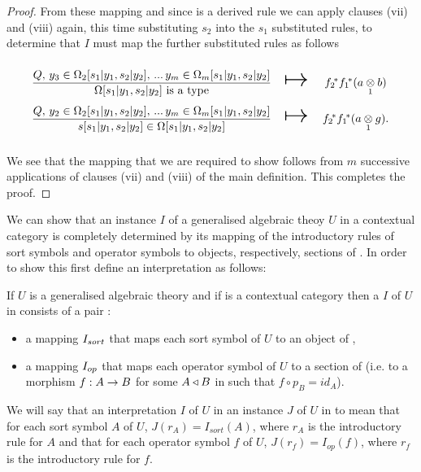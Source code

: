 {\begin{proof}
From these mapping and since  \stworule is a derived rule we can  apply clauses (vii) and (viii) again,
this time substituting $s_2$ into the $s_1$ substituted rules, to determine that $I$ must map the further substituted rules as follows
\begin{equation*}
\begin{array}{c c c}
\forceSOURCEwidth & & \forceTARGETwidth \\ [-0.1cm]
\weakenedOmegaruleSecondsubstitution  & \Imapsto & \ftwostar \fonestar(\crossx{a}{b}{1})   \\ [0.4cm]
\weakenedsruleSecondsubstitution      & \Imapsto & \ftwostar \fonestar(\crossx{a}{g}{1}).
\end{array}
\end{equation*}

We see that the mapping that we are required to show follows from $m$ successive applications of clauses (vii) and (viii) of the main definition.
This completes the proof.
\end{proof}
} %

\newpage
We can show that an instance $I$ of a generalised algebraic theoy $U$ in a contextual category \catcw is
completely determined by its mapping of the introductory rules of sort symbols and operator symbols to
objects, respectively, sections of \catc. In order to show this first define an interpretation as follows:
\begin{definition}
If $U$ is a generalised algebraic theory  and if \catcw is a contextual category then
a  $I$ of  $U$ in \catcw consists of a pair :
\begin{itemize}
\item a mapping $I_{sort}$ that maps each sort symbol of $U$ to  an object of \catc,
\item a mapping $I_{op}$ that maps each operator symbol of $U$ to a section of \catcw (i.e. to a morphism $f: A \rightarrow B$ for some 
$A \triangleleft B$ in \catcw such that $f \circ p_B=id_A$).
\end{itemize}
\end{definition}


We will say that  an interpretation $I$ of $U$ in \catcw {} an  instance $J$ of $U$ in \catcw to mean that for each sort symbol $A$ of $U$,
$J(r_A) = I_{sort}(A)$, where $r_A$ is the introductory rule for $A$ and that for each operator symbol
$f$ of $U$,   $J(r_f) = I_{op}(f)$, where $r_f$ is the introductory rule for $f$.

